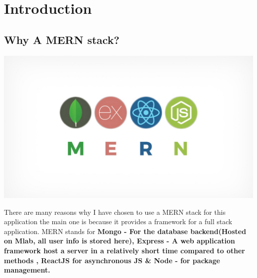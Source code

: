 \chapter{Introduction}
\section {Why A MERN stack?}
\begin{center}
\includegraphics[width=\textwidth]{img/mern.jpeg}
\end{center}
There are many reasons why I have chosen to use a MERN stack for this
application the main one is because it provides a framework for a full stack
application.
MERN stands for \textbf{Mongo - For the database backend(Hosted on Mlab, all user info is stored here),
Express - A web application framework
host a server in a relatively short time compared to other methods
, ReactJS for asynchronous JS \& Node - for package management.}
\cite{MERN}
\\

